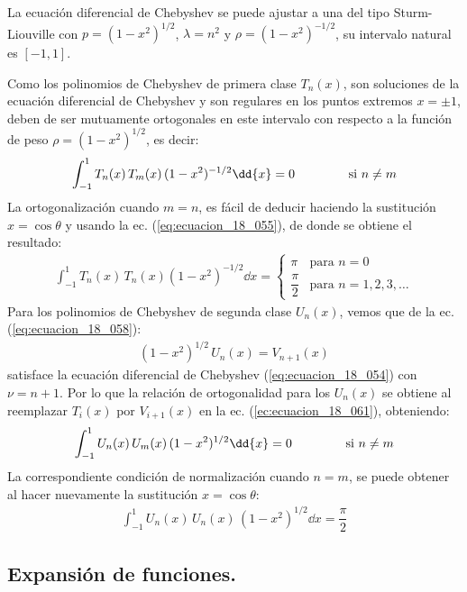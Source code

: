 La ecuación diferencial de Chebyshev se puede ajustar a una del tipo Sturm-Liouville con $p = (1 - x^{2})^{1/2}$, $\lambda = n^{2}$ y $\rho = (1 - x^{2})^{-1/2}$, su intervalo natural es $[-1, 1]$.
\par
Como los polinomios de Chebyshev de primera clase $T_{n}(x)$, son soluciones de la ecuación diferencial de Chebyshev y son regulares en los puntos extremos $x = \pm 1$, deben de ser mutuamente ortogonales en este intervalo con respecto a la función de peso $\rho = (1 - x^{2})^{1/2}$, es decir:
\begin{align}
\int_{-1}^{1} T_{n}(x) \, T_{m}(x) \, (1 - x^{2})^{-1/2} \dd{x} = 0 \hspace{1.5cm} \mbox{si  } n \neq m
\label{ec:ecuacion_18_061}
\end{align}
La ortogonalización cuando $m = n$, es fácil de deducir haciendo la sustitución $x = \cos \theta$ y usando la ec. (\ref{eq:ecuacion_18_055}), de donde se obtiene el resultado:
\begin{align}
\int_{-1}^{1} T_{n} (x) \, T_{n} (x) (1 - x^{2})^{-1/2} \dd{x} = \begin{cases}
\pi & \mbox{para  } n = 0 \\[0.5em]
\dfrac{\pi}{2} & \mbox{para  } n = 1, 2, 3, \ldots
\end{cases}
\label{eq:ecuacion_18_062}
\end{align}
Para los polinomios de Chebyshev de segunda clase $U_{n}(x)$, vemos que de la ec. (\ref{eq:ecuacion_18_058}):
\begin{align*}
(1 - x^{2})^{1/2} \, U_{n} (x) = V_{n+1} (x)
\end{align*}
satisface la ecuación diferencial de Chebyshev (\ref{eq:ecuacion_18_054}) con $\nu = n + 1$. Por lo que la relación de ortogonalidad para los $U_{n}(x)$ se obtiene al reemplazar $T_{i}(x)$ por $V_{i+1} (x)$ en la ec. (\ref{ec:ecuacion_18_061}), obteniendo:
\begin{align*}
\int_{-1}^{1} U_{n}(x) \, U_{m}(x) \, (1 - x^{2})^{1/2} \dd{x} = 0 \hspace{1.5cm} \mbox{si  } n \neq m
\end{align*}
La correspondiente condición de normalización cuando $n = m$, se puede obtener al hacer nuevamente la sustitución $x  = \cos \theta$:
\begin{align*}
\int_{-1}^{1} U_{n}(x) \, U_{n}(x) \, (1 - x^{2})^{1/2} \dd{x} = \dfrac{\pi}{2}
\end{align*}

\subsection{Expansión de funciones.}

